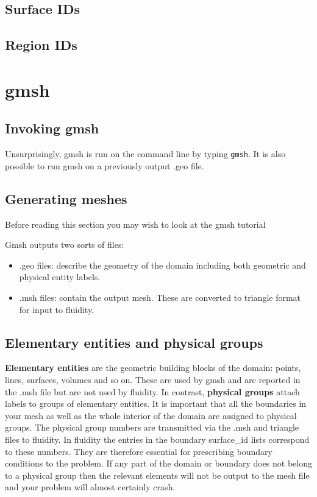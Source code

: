 \subsection{Surface IDs}\label{sect:surface_ids}

\subsection{Region IDs}\label{sect:region_ids}

\section{gmsh}
\label{sect:gmsh}
\subsection{Invoking gmsh}
Unsurprisingly, gmsh is run on the command line by typing
\lstinline[language=Python]{gmsh}. It is also possible to run gmsh on a
previously output .geo file.

\subsection{Generating meshes}
Before reading this section you may wish to look at the gmsh tutorial

Gmsh outputs two sorts of files:

\begin{itemize}
\item .geo files: describe the geometry of the domain including both geometric and physical entity labels. 
\item .msh files: contain the output mesh. These are converted to triangle format for input to fluidity. 
\end{itemize}

\subsection{Elementary entities and physical groups}
\textbf{Elementary entities} are the geometric building blocks of the
domain: points, lines, surfaces, volumes and so on. These are used by gmsh
and are reported in the .msh file but are not used by fluidity. In contrast,
\textbf{physical groups} attach labels to groups of elementary entities. It
is important that all the boundaries in your mesh as well as the whole
interior of the domain are assigned to physical groups. The physical group
numbers are transmitted via the .msh and triangle files to fluidity. In
fluidity the entries in the boundary surface\_id lists correspond to these
numbers. They are therefore essential for prescribing boundary conditions to
the problem. If any part of the domain or boundary does not belong to a
physical group then the relevant elements will not be output to the mesh
file and your problem will almost certainly crash.

